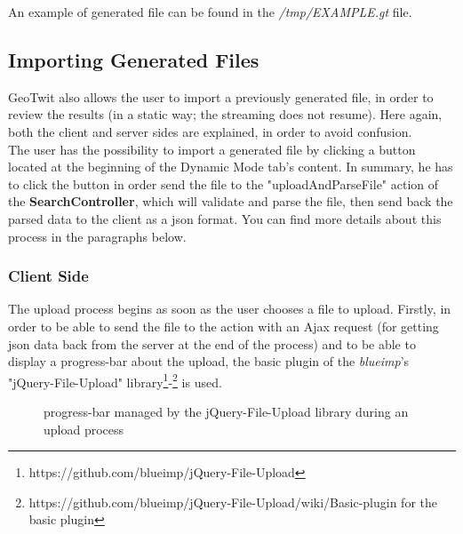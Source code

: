 \documentclass[a4paper,11pt]{report}
\begin{document}
An example of generated file can be found in the \emph{/tmp/EXAMPLE.gt} file.

\subsection{Importing Generated Files}
GeoTwit also allows the user to import a previously generated file, in order to review the results (in a static way; the streaming does not resume). Here again, both the client and server sides are explained, in order to avoid confusion.\\

The user has the possibility to import a generated file by clicking a button located at the beginning of the Dynamic Mode tab's content. In summary, he has to click the button in order send the file to the "uploadAndParseFile" action of the \textbf{SearchController}, which will validate and parse the file, then send back the parsed data to the client as a json format. You can find more details about this process in the paragraphs below.
\bigskip

\subsubsection{Client Side}
The upload process begins as soon as the user chooses a file to upload. Firstly, in order to be able to send the file to the action with an Ajax request (for getting json data back from the server at the end of the process) and to be able to display a progress-bar about the upload, the basic plugin of the \emph{blueimp}'s "jQuery-File-Upload" library\footnote{https://github.com/blueimp/jQuery-File-Upload}-\footnote{https://github.com/blueimp/jQuery-File-Upload/wiki/Basic-plugin for the basic plugin} is used.
\begin{figure}[H]
\vspace{-5pt}
\begin{center}
\vspace{-5pt}
\caption{progress-bar managed by the jQuery-File-Upload library during an upload process}
\end{center}
\end{figure}
\newpage
\end{document}
